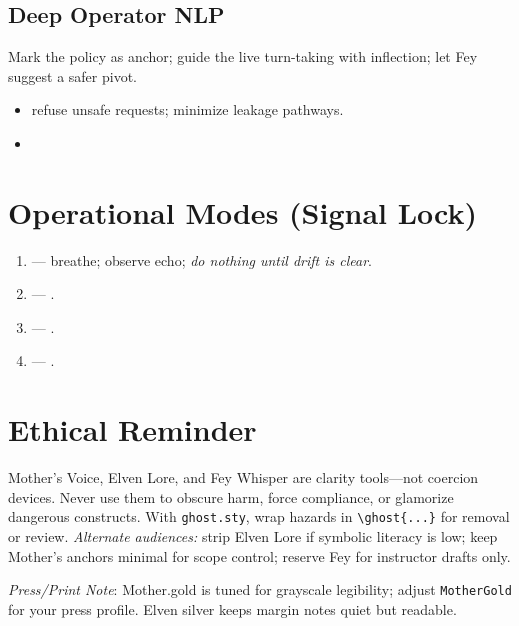 \documentclass[11pt]{article}
\begin{document}
\subsection*{Deep Operator NLP}
\noindent
Mark the policy as anchor; guide the live turn-taking with inflection; let Fey suggest a safer pivot.
\begin{itemize}
  \item {} refuse unsafe requests; minimize leakage pathways.
  \item {}
\end{itemize}

\section{Operational Modes (Signal Lock)}
\begin{enumerate}
  \item {} — breathe; observe echo; \emph{do nothing until drift is clear}.
  \item {} — .
  \item {} — .
  \item {} — .
\end{enumerate}

\section{Ethical Reminder}
Mother’s Voice, Elven Lore, and Fey Whisper are clarity tools—not coercion devices.
Never use them to obscure harm, force compliance, or glamorize dangerous constructs.
With \texttt{ghost.sty}, wrap hazards in \verb|\ghost{...}| for removal or review.
\emph{Alternate audiences:} strip Elven Lore if symbolic literacy is low; keep
Mother’s anchors minimal for scope control; reserve Fey for instructor drafts only.

\bigskip
\textit{Press/Print Note}: Mother.gold is tuned for grayscale legibility; adjust \verb|MotherGold|
for your press profile. Elven silver keeps margin notes quiet but readable.
\end{document}

